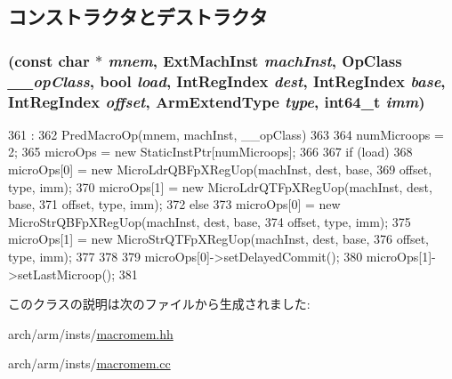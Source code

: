 \subsection{コンストラクタとデストラクタ}
\hypertarget{classArmISA_1_1BigFpMemRegOp_ad1eb7e0d1cbb6a2e6213f92ba6babe90}{
\subsubsection[{BigFpMemRegOp}]{ (const char $\ast$ {\em mnem}, \/  {\bf ExtMachInst} {\em machInst}, \/  OpClass {\em \_\-\_\-opClass}, \/  bool {\em load}, \/  {\bf IntRegIndex} {\em dest}, \/  {\bf IntRegIndex} {\em base}, \/  {\bf IntRegIndex} {\em offset}, \/  {\bf ArmExtendType} {\em type}, \/  int64\_\-t {\em imm})}}
\label{classArmISA_1_1BigFpMemRegOp_ad1eb7e0d1cbb6a2e6213f92ba6babe90}



\begin{DoxyCode}
361                                                               :
362     PredMacroOp(mnem, machInst, __opClass)
363 {
364     numMicroops = 2;
365     microOps = new StaticInstPtr[numMicroops];
366 
367     if (load) {
368         microOps[0] = new MicroLdrQBFpXRegUop(machInst, dest, base,
369                                               offset, type, imm);
370         microOps[1] = new MicroLdrQTFpXRegUop(machInst, dest, base,
371                                               offset, type, imm);
372     } else {
373         microOps[0] = new MicroStrQBFpXRegUop(machInst, dest, base,
374                                               offset, type, imm);
375         microOps[1] = new MicroStrQTFpXRegUop(machInst, dest, base,
376                                               offset, type, imm);
377     }
378 
379     microOps[0]->setDelayedCommit();
380     microOps[1]->setLastMicroop();
381 }

\end{DoxyCode}


このクラスの説明は次のファイルから生成されました:\begin{DoxyCompactItemize}
\item 
arch/arm/insts/\hyperlink{macromem_8hh}{macromem.hh}\item 
arch/arm/insts/\hyperlink{macromem_8cc}{macromem.cc}\end{DoxyCompactItemize}
